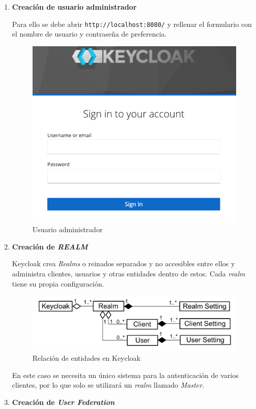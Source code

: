 \begin{enumerate}
	\item \textbf{Creación de usuario administrador}
	
	Para ello se debe abrir \texttt{http://localhost:8080/}
	y rellenar el formulario con el nombre de usuario y contraseña de preferencia.
	
	\begin{figure}[H]
		\centering
		\includegraphics[width=0.7\linewidth]{Graphics/admin_console}
		\caption{Usuario administrador}
		\label{fig:adminconsole}
	\end{figure}
	
	
	\item \textbf{Creación de \textit{REALM}}
	
	Keycloak crea \textit{Realms} o reinados separados y no accesibles entre ellos y administra clientes, usuarios y otras entidades dentro de estos. Cada \textit{realm} tiene su propia configuración.
	\begin{figure}[H]
		\centering
		\includegraphics[width=0.9\linewidth]{Graphics/keycloak_realm}
		\caption{Relación de entidades en Keycloak}
		\label{fig:keycloakrealm}
	\end{figure}
	En este caso se necesita un único sistema para la autenticación de varios clientes, por lo que solo se utilizará un \textit{realm} llamado \textit{Master}.
	
	\item \textbf{Creación de \textit{User Federation}}
	

\end{enumerate}
